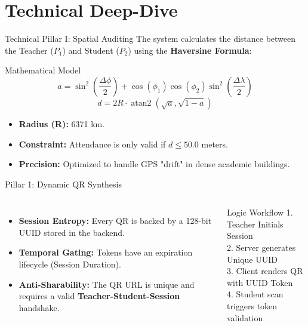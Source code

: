 \documentclass[10pt, aspectratio=169]{beamer}
\begin{document}
\section{Technical Deep-Dive}
\begin{frame}{Technical Pillar I: Spatial Auditing}
    The system calculates the distance between the Teacher ($P_1$) and Student ($P_2$) using the \textbf{Haversine Formula}:
    \begin{block}{Mathematical Model}
        \begin{equation*}
            a = \sin^2\left(\frac{\Delta\phi}{2}\right) + \cos(\phi_1)\cos(\phi_2)\sin^2\left(\frac{\Delta\lambda}{2}\right)
        \end{equation*}
        \begin{equation*}
            d = 2R \cdot \operatorname{atan2}\left(\sqrt{a}, \sqrt{1-a}\right)
        \end{equation*}
    \end{block}
    \begin{itemize}
        \item \textbf{Radius (R):} 6371 km.
        \item \textbf{Constraint:} Attendance is only valid if $d \leq 50.0$ meters.
        \item \textbf{Precision:} Optimized to handle GPS "drift" in dense academic buildings.
    \end{itemize}
\end{frame}

\begin{frame}{Pillar 1: Dynamic QR Synthesis}
    \begin{columns}
        \begin{itemize}
            \item \textbf{Session Entropy:} Every QR is backed by a 128-bit UUID stored in the backend.
            \item \textbf{Temporal Gating:} Tokens have an expiration lifecycle (Session Duration).
            \item \textbf{Anti-Sharability:} The QR URL is unique and requires a valid \textbf{Teacher-Student-Session} handshake.
        \end{itemize}
        \begin{block}{Logic Workflow}
            \scriptsize
            1. Teacher Initials Session \\
            2. Server generates Unique UUID \\
            3. Client renders QR with UUID Token \\
            4. Student scan triggers token validation
        \end{block}
    \end{columns}
\end{frame}
\end{document}
